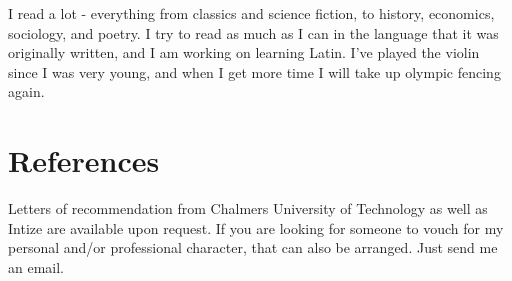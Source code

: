 \documentclass[letterpaper,
		10pt]{article}
\let\oldhref\href
\renewcommand{\href}[3][blue]{\oldhref{#2}{\color{#1}{#3}}}
\begin{document}
I read a lot - everything from classics and science fiction, to history, economics, sociology, and poetry.
I try to read as much as I can in the language that it was originally written, and I am working
on learning Latin. I've played the violin since I was very young, and when I get more time
I will take up olympic fencing again.


\section{References}
    
Letters of recommendation from Chalmers University of Technology as well as Intize are available upon request.
If you are looking for someone to vouch for my personal and/or professional character, that can also be arranged.
Just send me an email.
\end{document}
